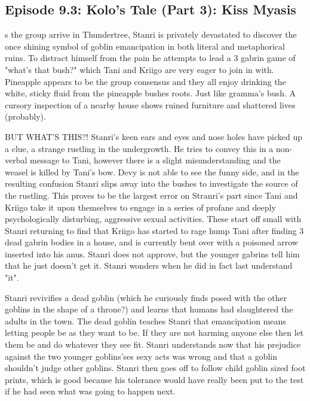 \subsection{Episode 9.3: Kolo's Tale (Part 3): Kiss Myasis}
s the group arrive in Thundertree, Stanri is privately devastated to discover the once shining symbol of goblin emancipation in both literal and metaphorical ruins. To distract himself from the pain he attempts to lead a 3 gabrin game of "what's that bush?" which Tani and Kriigo are very eager to join in with. Pineapple appears to be the group consensus and they all enjoy drinking the white, sticky fluid from the pineapple bushes roots. Just like gramma's bush. A cursory inspection of a nearby house shows ruined furniture and shattered lives (probably).\medskip

BUT WHAT'S THIS?! Stanri's keen ears and eyes and nose holes have picked up a clue, a strange rustling in the undergrowth. He tries to convey this in a non-verbal message to Tani, however there is a slight misunderstanding and the weasel is killed by Tani's bow. Devy is not able to see the funny side, and in the resulting confusion Stanri slips away into the bushes to investigate the source of the rustling. This proves to be the largest error on Stranri's part since Tani and Kriigo take it upon themselves to engage in a series of profane and deeply psychologically disturbing, aggressive sexual activities. These start off small with Stanri returning to find that Kriigo has started to rage hump Tani after finding 3 dead gabrin bodies in a house, and is currently bent over with a poisoned arrow inserted into his anus. Stanri does not approve, but the younger gabrins tell him that he just doesn't get it. Stanri wonders when he did in fact last understand "it".\medskip

Stanri revivifies a dead goblin (which he curiously finds posed with the other goblins in the shape of a throne?) and learns that humans had slaughtered the adults in the town. The dead goblin teaches Stanri that emancipation means letting people be as they want to be. If they are not harming anyone else then let them be and do whatever they see fit. Stanri understands now that his prejudice against the two younger goblins'ses sexy acts was wrong and that a goblin shouldn't judge other goblins. Stanri then goes off to follow child goblin sized foot prints, which is good because his tolerance would have really been put to the test if he had seen what was going to happen next.\medskip

